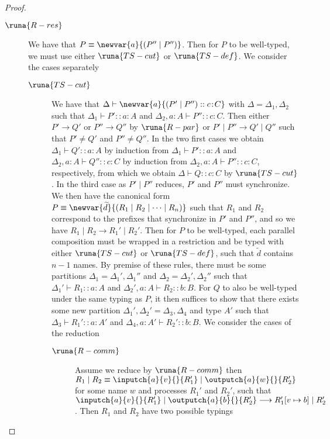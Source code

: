 \begin{theorem}
\begin{proof}
\begin{description}
\item[$\runa{R-res}$] We have that $P\equiv\newvar{a}{(P'' \mid P'')}$. Then for $P$ to be well-typed, we must use either $\runa{TS-cut}$ or $\runa{TS-def}$. We consider the cases separately
\begin{description}
    \item[$\runa{TS-cut}$] We have that $\Delta\vdash \newvar{a}{(P' \mid P'') :: c\!:\!C}$ with $\Delta=\Delta_1,\Delta_2$ such that $\Delta_1\vdash P' :: a\!:\!A$ and $\Delta_2,a:A\vdash P'' :: c\!:\!C$. Then either $P' \longrightarrow Q'$ or $P''\longrightarrow Q''$ by $\runa{R-par}$ or $P' \mid P'' \longrightarrow Q'\mid Q''$ such that $P'\neq Q'$ and $P''\neq Q''$. In the two first cases we obtain $\Delta_1\vdash Q' :: a\!:\!A$ by induction from $\Delta_1\vdash P' :: a\!:\!A$ and $\Delta_2,a:A\vdash Q'' :: c\!:\!C$ by induction from $\Delta_2,a:A\vdash P'' :: c\!:\!C$, respectively, from which we obtain $\Delta\vdash Q :: c\!:\!C$ by $\runa{TS-cut}$. In the third case as $P' \mid P''$ reduces, $P'$ and $P''$ must synchronize. We then have the canonical form $P\equiv\newvar{\widetilde{d}}{(R_1 \mid R_2 \mid \cdots \mid R_n)}$ such that $R_1$ and $R_2$ correspond to the prefixes that synchronize in $P'$ and $P''$, and so we have $R_1 \mid R_2 \longrightarrow R_1' \mid R_2'$. Then for $P$ to be well-typed, each parallel composition must be wrapped in a restriction and be typed with either $\runa{TS-cut}$ or $\runa{TS-def}$, such that $\widetilde{d}$ contains $n-1$ names. By premise of these rules, there must be some partitions $\Delta_1=\Delta_1',\Delta_1''$ and $\Delta_2=\Delta_2',\Delta_2''$ such that $\Delta_1'\vdash R_1 :: a\!:\!A$ and $\Delta_2',a:A\vdash R_2 :: b\!:\!B$. For $Q$ to also be well-typed under the same typing as $P$, it then suffices to show that there exists some new partition $\Delta_1',\Delta_2'=\Delta_3,\Delta_4$ and type $A'$ such that $\Delta_3\vdash R_1' :: a\!:\!A'$ and $\Delta_4,a:A'\vdash R_2' :: b\!:\!B$. We consider the cases of the reduction 
    \begin{description}
    \item[$\runa{R-comm}$]
    Assume we reduce by $\runa{R-comm}$ then $R_1 \mid R_2 \equiv \inputch{a}{v}{}{R_1'} \mid \outputch{a}{w}{}{R_2'}$ for some name $w$ and processes $R_1'$ and $R_2'$, such that $\inputch{a}{v}{}{R_1'} \mid \outputch{a}{b}{}{R_2'} \longrightarrow R_1'[v\mapsto b] \mid R_2'$. Then $R_1$ and $R_2$ have two possible typings
    \begin{enumerate}

\end{enumerate}
\end{description}
\end{description}
\end{description}
\end{proof}
\end{theorem}
